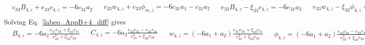 \documentclass[12pt,sort&compress,fleqn,3p]{elsarticle}
\newcommand{\er}[4]{{#1}_{#2}{#3}_{#4}}
\newcommand{\de}[5]{{#1}_{#2}{#3}_{{#4},{#5}}}
\begin{document}
\begin{subequations}\label{labeq_AppB+4_diff}
\begin{equation}\label{labeq_AppB+4_diff01}
\begin{split}
&\de{c}{33}{B}{4}{z}+\de{e}{33}{c}{4}{z}=-6\er{c}{31}{a}{2}\\
\end{split}
\end{equation}
\begin{equation}\label{labeq_AppB+4_diff2}
\begin{split}
&\de{c}{33}{w}{4}{z}+\de{e}{33}{\phi}{m}{z}= -6c_{31}a_{1}-c_{31}a_{2}\\
\end{split}
\end{equation}
\begin{equation}\label{labeq_AppB+4_diff03}
\begin{split}
&\de{e}{33}{B}{4}{z}-\de{\xi}{33}{c}{4}{z}= -6\er{e}{31}{a}{2}\\
\end{split}
\end{equation}
\begin{equation}\label{labeq_AppB+4_diff04}
\begin{split}
&\de{e}{33}{w}{4}{z}-\de{\xi}{33}{\phi}{4}{z}=-6e_{31}a_{1}-e_{31}a_{2}\\
\end{split}
\end{equation}
\end{subequations}
Solving Eq.~\eqref{labeq_AppB+4_diff} gives
\begin{subequations}\label{AppB+4_diffresult}
\begin{equation}\label{AppB+4_diffresult01}
\begin{split}
&B_{4,z}=-6a_{2}\frac{\er{e}{31}{e}{33}+\xi_{33}c_{31}}{e_{33}^{2}+\xi_{33}c_{33}}\\
\end{split}
\end{equation}
\begin{equation}\label{AppB+4_diffresult02}
\begin{split}
&C_{4,z}=-6a_{2}\frac{\er{e}{33}{c}{31}-c_{33}e_{31}}{e_{33}^{2}+\xi_{33}c_{33}} \\
\end{split}
\end{equation}
\begin{equation}\label{AppB+4_diffresult03}
\begin{split}
&w_{4,z}=(-6a_{1}+a_{2})\frac{\er{e}{31}{e}{33}+\xi_{33}c_{31}}{e_{33}^{2}+\xi_{33}c_{33}}\\
\end{split}
\end{equation}
\begin{equation}\label{AppB+4_diffresult04}
\begin{split}
&\phi_{4,z}=(-6a_{1}+a_{2})\frac{\er{e}{33}{c}{31}-c_{33}e_{31}}{e_{33}^{2}+\xi_{33}c_{33}}.
\end{split}
\end{equation}
\end{subequations}
\end{document}
